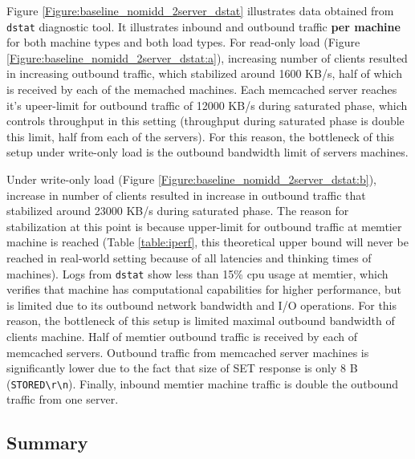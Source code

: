 \documentclass[11pt,a4paper]{article}
\begin{document}
Figure \ref{Figure:baseline_nomidd_2server_dstat} illustrates data obtained from \texttt{dstat} diagnostic tool. It illustrates inbound and outbound traffic \textbf{per machine} for both machine types and both load types. For read-only load (Figure \ref{Figure:baseline_nomidd_2server_dstat:a}), increasing number of clients resulted in increasing outbound traffic, which stabilized around 1600 KB/s, half of which is received by each of the memached machines. Each memcached server reaches it's upeer-limit for outbound traffic of 12000 KB/s during saturated phase, which controls throughput in this setting (throughput during saturated phase is double this limit, half from each of the servers). For this reason, the bottleneck of this setup under write-only load is the outbound bandwidth limit of servers machines. 

Under write-only load (Figure \ref{Figure:baseline_nomidd_2server_dstat:b}), increase in number of clients resulted in increase in outbound traffic that stabilized around 23000 KB/s during saturated phase. The reason for stabilization at this point is because upper-limit for outbound traffic at memtier machine is reached (Table \ref*{table:iperf}, this theoretical upper bound will never be reached in real-world setting because of all latencies and thinking times of machines). Logs from \texttt{dstat} show less than 15\% cpu usage at memtier, which verifies that machine has computational capabilities for higher performance, but is limited due to its outbound network bandwidth and I/O operations. For this reason, the bottleneck of this setup is limited maximal outbound bandwidth of clients machine. Half of memtier outbound traffic is received by each of memcached servers. Outbound traffic from memcached server machines is significantly lower due to the fact that size of SET response is only 8 B (\texttt{STORED\textbackslash r\textbackslash n}). Finally, inbound memtier machine traffic is double the outbound traffic from one server.

\subsection{Summary}
\end{document}
